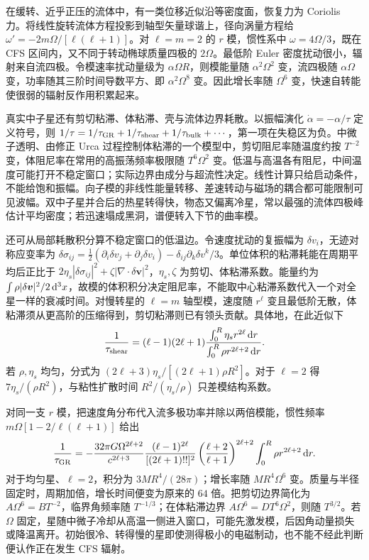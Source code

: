 在缓转、近乎正压的流体中，有一类位移近似沿等密度面，恢复力为 Coriolis 力。将线性旋转流体方程投影到轴型矢量球谐上，径向涡量方程给 $\omega'=-2m\Omega/[\ell(\ell+1)]$。对 $\ell=m=2$ 的 $r$ 模，惯性系中 $\omega=4\Omega/3$，既在 CFS 区间内，又不同于转动椭球质量四极的 $2\Omega$。最低阶 Euler 密度扰动很小，辐射来自流四极。令模速率扰动量级为 $\alpha\Omega R$，则模能量随 $\alpha^2\Omega^2$ 变，流四极随 $\alpha\Omega$ 变，功率随其三阶时间导数平方、即 $\alpha^2\Omega^8$ 变。因此增长率随 $\Omega^6$ 变，快速自转能使很弱的辐射反作用积累起来。

真实中子星还有剪切粘滞、体粘滞、壳与流体边界耗散。以振幅演化 $\dot\alpha=-\alpha/\tau$ 定义符号，则 $1/\tau=1/\tau_{\rm GR}+1/\tau_{\rm shear}+1/\tau_{\rm bulk}+\cdots$，第一项在失稳区为负。中微子透明、由修正 Urca 过程控制体粘滞的一个模型中，剪切阻尼率随温度约按 $T^{-2}$ 变，体阻尼率在常用的高振荡频率极限随 $T^6\Omega^2$ 变。低温与高温各有阻尼，中间温度可能打开不稳定窗口；实际边界由成分与超流性决定。线性计算只给启动条件，不能给饱和振幅。向子模的非线性能量转移、差速转动与磁场的耦合都可能限制可见波幅。双中子星并合后的热星转得快，物态又偏离冷星，常以最强的流体四极峰估计平均密度；若迅速塌成黑洞，谱便转入下节的曲率模。

还可从局部耗散积分算不稳定窗口的低温边。令速度扰动的复振幅为 $\delta v_i$，无迹对称应变率为 $\delta\sigma_{ij}=\tfrac12(\partial_i\delta v_j+\partial_j\delta v_i)-\delta_{ij}\partial_k\delta v^k/3$。单位体积的粘滞耗能在周期平均后正比于 $2\eta_s|\delta\sigma_{ij}|^2+\zeta|\nabla\cdot\delta\bm v|^2$，$\eta_s,\zeta$ 为剪切、体粘滞系数。能量约为 $\int\rho|\delta\bm v|^2/2\,\dd^3x$，故模的体积积分决定阻尼率，不能取中心粘滞系数代入一个对全星一样的衰减时间。对慢转星的 $\ell=m$ 轴型模，速度随 $r^\ell$ 变且最低阶无散，体粘滞须从更高阶的压缩得到，剪切粘滞则已有领头贡献。具体地，在此近似下
\[
 \frac{1}{\tau_{\rm shear}}=(\ell-1)(2\ell+1)
   \frac{\int_0^R \eta_s r^{2\ell}\,\dd r}
        {\int_0^R \rho r^{2\ell+2}\,\dd r}.
\]
若 $\rho,\eta_s$ 均匀，分式为 $(2\ell+3)\eta_s/[(2\ell+1)\rho R^2]$。对于 $\ell=2$ 得 $7\eta_s/(\rho R^2)$，与粘性扩散时间 $R^2/(\eta_s/\rho)$ 只差模结构系数。

对同一支 $r$ 模，把速度角分布代入流多极功率并除以两倍模能，惯性频率 $m\Omega[1-2/\ell(\ell+1)]$ 给出
\[
 \frac{1}{\tau_{\rm GR}}=-\frac{32\pi G\Omega^{2\ell+2}}{c^{2\ell+3}}
 \frac{(\ell-1)^{2\ell}}{[(2\ell+1)!!]^2}
 \left(\frac{\ell+2}{\ell+1}\right)^{2\ell+2}
 \int_0^R \rho r^{2\ell+2}\,\dd r .
\]
对于均匀星、$\ell=2$，积分为 $3MR^4/(28\pi)$；增长率随 $M R^4\Omega^6$ 变。质量与半径固定时，周期加倍，增长时间便变为原来的 $64$ 倍。把剪切边界简化为 $A\Omega^6=B T^{-2}$，临界角频率随 $T^{-1/3}$；在体粘滞边界 $A\Omega^6=D T^6\Omega^2$，则随 $T^{3/2}$。若 $\Omega$ 固定，星随中微子冷却从高温一侧进入窗口，可能先激发模，后因角动量损失或降温离开。初始很冷、转得慢的星即使测得极小的电磁制动，也不能不经此判断便认作正在发生 CFS 辐射。

